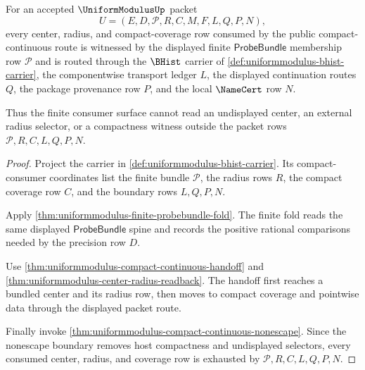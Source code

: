\begin{theorem}
\label{thm:uniformmodulus-probebundle-membership-exhaustion}
For an accepted $\UniformModulusUp$ packet
$$
U=(E,D,\mathcal{P},R,C,M,F,L,Q,P,N),
$$
every center, radius, and compact-coverage row consumed by the public compact-continuous route is witnessed by the displayed finite $\mathsf{ProbeBundle}$ membership row $\mathcal{P}$ and is routed through the $\BHist$ carrier of \autoref{def:uniformmodulus-bhist-carrier}, the componentwise transport ledger $L$, the displayed continuation routes $Q$, the package provenance row $P$, and the local $\NameCert$ row $N$.

Thus the finite consumer surface cannot read an undisplayed center, an external radius selector, or a compactness witness outside the packet rows $\mathcal{P},R,C,L,Q,P,N$.
\end{theorem}
\begin{proof}
Project the carrier in \autoref{def:uniformmodulus-bhist-carrier}. Its compact-consumer coordinates list the finite bundle $\mathcal{P}$, the radius rows $R$, the compact coverage row $C$, and the boundary rows $L,Q,P,N$.

Apply \autoref{thm:uniformmodulus-finite-probebundle-fold}. The finite fold reads the same displayed $\mathsf{ProbeBundle}$ spine and records the positive rational comparisons needed by the precision row $D$.

Use \autoref{thm:uniformmodulus-compact-continuous-handoff} and \autoref{thm:uniformmodulus-center-radius-readback}. The handoff first reaches a bundled center and its radius row, then moves to compact coverage and pointwise data through the displayed packet route.

Finally invoke \autoref{thm:uniformmodulus-compact-continuous-nonescape}. Since the nonescape boundary removes host compactness and undisplayed selectors, every consumed center, radius, and coverage row is exhausted by $\mathcal{P},R,C,L,Q,P,N$.
\end{proof}

